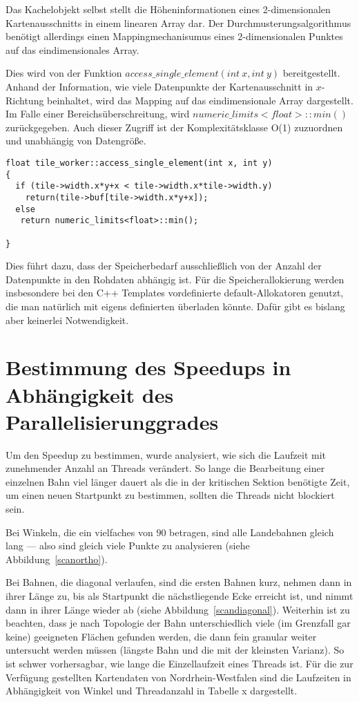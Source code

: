 \documentclass[10pt,a4paper]{report}
\begin{document}
Das Kachelobjekt selbst stellt die Höheninformationen eines 2-dimensionalen Kartenausschnitts in einem linearen Array dar. Der Durchmusterungsalgorithmus benötigt allerdings einen Mappingmechanisumus eines 2-dimensionalen Punktes auf das eindimensionales Array.

Dies wird von der Funktion $access\_single\_element(int\ x, int\ y)$ bereitgestellt. Anhand der Information, wie viele Datenpunkte der Kartenausschnitt in $x$-Richtung beinhaltet, wird das Mapping auf das eindimensionale Array dargestellt. Im Falle einer Bereichsüberschreitung, wird $numeric\_limits<float>::min()$ zurückgegeben.
Auch dieser Zugriff ist der Komplexitätsklasse O(1) zuzuordnen und unabhängig von Datengröße.

\begin{lstlisting}
float tile_worker::access_single_element(int x, int y)
{
  if (tile->width.x*y+x < tile->width.x*tile->width.y)
    return(tile->buf[tile->width.x*y+x]);
  else
   return numeric_limits<float>::min();

}
\end{lstlisting}

Dies führt dazu, dass der Speicherbedarf ausschließlich von der Anzahl der Datenpunkte in den Rohdaten abhängig ist. Für die Speicherallokierung werden insbesondere bei den C++ Templates vordefinierte default-Allokatoren genutzt, die man natürlich mit eigens definierten überladen könnte. Dafür gibt es bislang aber keinerlei Notwendigkeit.
 


\section{Bestimmung des Speedups in Abhängigkeit des Parallelisierunggrades}

Um den Speedup zu bestimmen, wurde analysiert, wie sich die Laufzeit mit zunehmender Anzahl an Threads verändert. So lange die Bearbeitung einer einzelnen Bahn viel länger dauert als die in der kritischen Sektion benötigte Zeit, um einen neuen Startpunkt zu bestimmen, sollten die Threads nicht blockiert sein.

Bei Winkeln, die ein vielfaches von $90$ betragen, sind alle Landebahnen gleich lang --- also sind gleich viele Punkte zu analysieren (siehe Abbildung~\ref{scanortho}).

Bei Bahnen, die diagonal verlaufen, sind die ersten Bahnen kurz, nehmen dann in ihrer Länge zu, bis als Startpunkt die nächstliegende Ecke erreicht ist, und nimmt dann in ihrer Länge wieder ab (siehe Abbildung~\ref{scandiagonal}). 
Weiterhin ist zu beachten, dass je nach Topologie der Bahn unterschiedlich viele (im Grenzfall gar keine) geeigneten Flächen gefunden werden, die dann fein granular weiter untersucht werden müssen (längste Bahn und die mit der kleinsten Varianz). So ist schwer vorhersagbar, wie lange die Einzellaufzeit eines Threads ist.
Für die zur Verfügung gestellten Kartendaten von Nordrhein-Westfalen sind die Laufzeiten in Abhängigkeit von Winkel und Threadanzahl in Tabelle x dargestellt.
\end{document}

